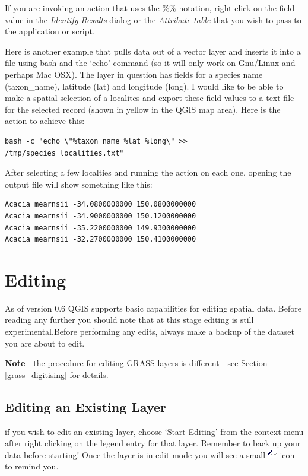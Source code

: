 If you are invoking an action that uses the \%\% notation, right-click on the
field value in the \textit{Identify Results} dialog or the
\textit{Attribute table} that you wish to pass to the application or script.

Here is another example that pulls data out of a vector layer and inserts it into a file using bash and the `echo' command (so it will only work on Gnu/Linux and perhaps Mac OSX). The layer in question has fields for a species name (taxon\_name), latitude (lat) and longitude (long). I would like to be able to make a spatial selection of a localites and export these field values to a text file for the selected record (shown in yellow in the QGIS map area). Here is the action to achieve this:

\begin{verbatim}
bash -c "echo \"%taxon_name %lat %long\" >> /tmp/species_localities.txt"
\end{verbatim} 

After selecting a few localties and running the action on each one, opening the output file will show something like this:

\begin{verbatim}
Acacia mearnsii -34.0800000000 150.0800000000
Acacia mearnsii -34.9000000000 150.1200000000
Acacia mearnsii -35.2200000000 149.9300000000
Acacia mearnsii -32.2700000000 150.4100000000
\end{verbatim} 


\section{Editing}


As of version 0.6 QGIS supports basic capabilities for editing spatial data. Before reading any further you should note that at this stage editing is still experimental.Before performing any edits, always make a backup of the dataset you are about to edit. 

\textbf{Note} - the procedure for editing GRASS layers is different - see Section \ref{grass_digitising} for details.

\subsection{Editing an Existing Layer}
\label{sec:edit_existing_layer}
if you wish to edit an existing layer,  choose `Start Editing' from the context menu after right clicking on the legend entry for that layer. Remember to back up your data before starting! Once the layer is in edit mode you will see a small \includegraphics[scale=1]{qgis_user_guide_images/editable} icon to remind you.

